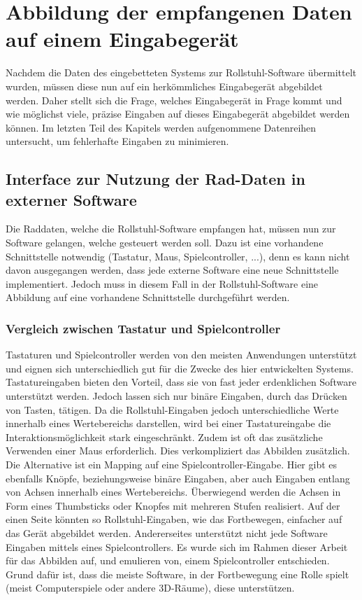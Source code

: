 \chapter{Abbildung der empfangenen Daten auf einem Eingabegerät}
Nachdem die Daten des eingebetteten Systems zur Rollstuhl-Software übermittelt wurden, müssen diese nun auf ein herkömmliches Eingabegerät abgebildet werden.
Daher stellt sich die Frage, welches Eingabegerät in Frage kommt und wie möglichst viele, präzise Eingaben auf dieses Eingabegerät abgebildet werden können.
Im letzten Teil des Kapitels werden aufgenommene Datenreihen untersucht, um fehlerhafte Eingaben zu minimieren.

\section{Interface zur Nutzung der Rad-Daten in externer Software}
Die Raddaten, welche die Rollstuhl-Software empfangen hat, müssen nun zur Software gelangen, welche gesteuert werden soll.
Dazu ist eine vorhandene Schnittstelle notwendig (Tastatur, Maus, Spielcontroller, ...), denn es kann nicht davon ausgegangen werden, dass jede externe Software eine neue Schnittstelle implementiert.
Jedoch muss in diesem Fall in der Rollstuhl-Software eine Abbildung auf eine vorhandene Schnittstelle durchgeführt werden.

\subsection{Vergleich zwischen Tastatur und Spielcontroller}
Tastaturen und Spielcontroller werden von den meisten Anwendungen unterstützt und eignen sich unterschiedlich gut für die Zwecke des hier entwickelten Systems.
Tastatureingaben bieten den Vorteil, dass sie von fast jeder erdenklichen Software unterstützt werden.
Jedoch lassen sich nur binäre Eingaben, durch das Drücken von Tasten, tätigen.
Da die Rollstuhl-Eingaben jedoch unterschiedliche Werte innerhalb eines Wertebereichs darstellen, wird bei einer Tastatureingabe die Interaktionsmöglichkeit stark eingeschränkt.
Zudem ist oft das zusätzliche Verwenden einer Maus erforderlich.
Dies verkompliziert das Abbilden zusätzlich.
Die Alternative ist ein Mapping auf eine Spielcontroller-Eingabe.
Hier gibt es ebenfalls Knöpfe, beziehungsweise binäre Eingaben, aber auch Eingaben entlang von Achsen innerhalb eines Wertebereichs.
Überwiegend werden die Achsen in Form eines Thumbsticks oder Knopfes mit mehreren Stufen realisiert.
Auf der einen Seite könnten so Rollstuhl-Eingaben, wie das Fortbewegen, einfacher auf das Gerät abgebildet werden.
Andererseites unterstützt nicht jede Software Eingaben mittels eines Spielcontrollers.
Es wurde sich im Rahmen dieser Arbeit für das Abbilden auf, und emulieren von, einem Spielcontroller entschieden.
Grund dafür ist, dass die meiste Software, in der Fortbewegung eine Rolle spielt (meist Computerspiele oder andere 3D-Räume), diese unterstützen.


